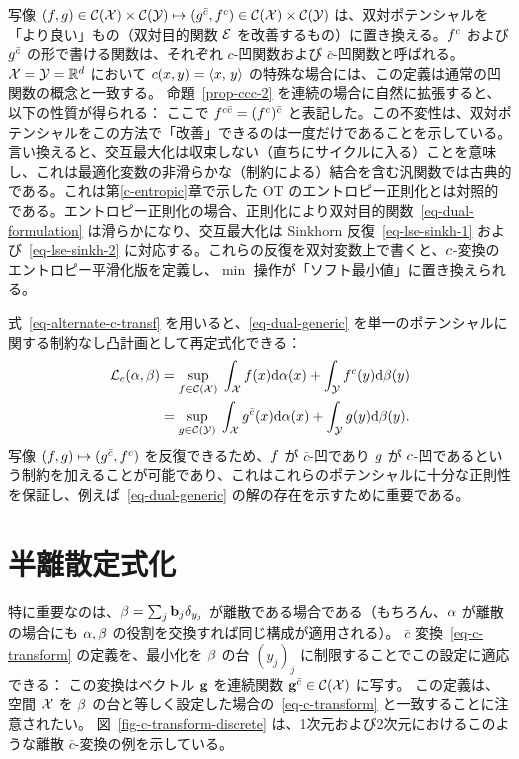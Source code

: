 写像 $(f,g) \in \mathcal{C}(\mathcal{X}) \times \mathcal{C}(\mathcal{Y}) \mapsto (g^{\bar{c}},f^c) \in \mathcal{C}(\mathcal{X}) \times \mathcal{C}(\mathcal{Y})$ は、双対ポテンシャルを「より良い」もの（双対目的関数 $\mathcal{E}$ を改善するもの）に置き換える。$f^c$ および $g^{\bar{c}}$ の形で書ける関数は、それぞれ $c$-凹関数および $\bar c$-凹関数と呼ばれる。
$\mathcal{X}=\mathcal{Y}=\mathbb{R}^d$ において $c(x,y)=\langle x,\,y\rangle$ の特殊な場合には、この定義は通常の凹関数の概念と一致する。
命題~\ref{prop-ccc-2} を連続の場合に自然に拡張すると、以下の性質が得られる：
ここで $f^{c\bar c} = (f^{c})^{\bar c}$ と表記した。この不変性は、双対ポテンシャルをこの方法で「改善」できるのは一度だけであることを示している。言い換えると、交互最大化は収束しない（直ちにサイクルに入る）ことを意味し、これは最適化変数の非滑らかな（制約による）結合を含む汎関数では古典的である。これは第\ref{c-entropic}章で示した OT のエントロピー正則化とは対照的である。エントロピー正則化の場合、正則化により双対目的関数~\eqref{eq-dual-formulation} は滑らかになり、交互最大化は Sinkhorn 反復~\eqref{eq-lse-sinkh-1} および~\eqref{eq-lse-sinkh-2} に対応する。これらの反復を双対変数上で書くと、$c$-変換のエントロピー平滑化版を定義し、$\min$ 操作が「ソフト最小値」に置き換えられる。

式~\eqref{eq-alternate-c-transf} を用いると、\eqref{eq-dual-generic} を単一のポテンシャルに関する制約なし凸計画として再定式化できる：
\begin{align}\label{eq-semi-dual-cont}
	\mathcal{L}_c(\alpha,\beta)
		&= \underset{f \in \mathcal{C}(\mathcal{X})}{\sup}\;
			\int_{\mathcal{X}} f(x) \mathrm{d}\alpha(x) + \int_{\mathcal{Y}} f^{c}(y) \mathrm{d}\beta(y) \\
		&= \underset{g \in \mathcal{C}(\mathcal{Y})}{\sup}\;
			\int_{\mathcal{X}} g^{\bar{c}}(x) \mathrm{d}\alpha(x) + \int_{\mathcal{Y}} g(y) \mathrm{d}\beta(y).
\end{align}
写像 $(f,g) \mapsto (g^{\bar{c}},f^c)$ を反復できるため、$f$ が $\bar c$-凹であり $g$ が $c$-凹であるという制約を加えることが可能であり、これはこれらのポテンシャルに十分な正則性を保証し、例えば~\eqref{eq-dual-generic} の解の存在を示すために重要である。

\section{半離散定式化}
\label{s-semidiscrete}

特に重要なのは、$\beta = \sum_j \mathrm{\textbf{b}}_j \delta_{y_j}$ が離散である場合である（もちろん、$\alpha$ が離散の場合にも $\alpha,\beta$ の役割を交換すれば同じ構成が適用される）。
$\bar c$ 変換~\eqref{eq-c-transform} の定義を、最小化を $\beta$ の台 $(y_j)_j$ に制限することでこの設定に適応できる：
この変換はベクトル $\mathrm{\textbf{g}}$ を連続関数 $\mathrm{\textbf{g}}^{\bar {c}} \in \mathcal{C}(\mathcal{X})$ に写す。
この定義は、空間 $\mathcal{X}$ を $\beta$ の台と等しく設定した場合の~\eqref{eq-c-transform} と一致することに注意されたい。
図~\ref{fig-c-transform-discrete} は、1次元および2次元におけるこのような離散 $\bar c$-変換の例を示している。


